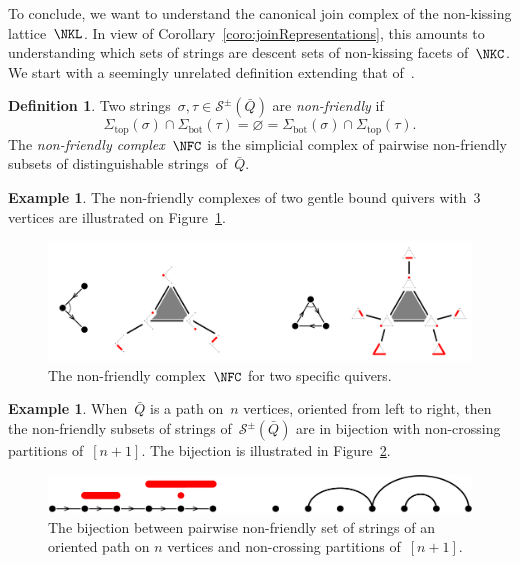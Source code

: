 \documentclass{amsart}
\theoremstyle{definition}
\newtheorem{definition}[theorem]{Definition}
\newtheorem{example}[theorem]{Example}
\newcommand{\fref}[1]{Figure~\ref{#1}} %
\newcommand{\darkblue}{\color{darkblue}} %
\newcommand{\defn}[1]{\textsl{\darkblue #1}} %
\newcommand{\strings}{\mathcal{S}} %
\renewcommand{\top}{\mathrm{top}} %
\newcommand{\bottom}{\mathrm{bot}} %
\begin{document}
\enlargethispage{.4cm}
To conclude, we want to understand the canonical join complex of the non-kissing lattice~$\NKL$.
In view of Corollary~\ref{coro:joinRepresentations}, this amounts to understanding which sets of strings are descent sets of non-kissing facets of~$\NKC$.
We start with a seemingly unrelated definition extending that of~\cite[Sect.~3.4]{GarverMcConville-grid}.

\begin{definition}\label{def: friendly}
Two strings~$\sigma, \tau \in \strings^\pm(\bar Q)$ are \defn{non-friendly} if
\[
\Sigma_\top(\sigma) \cap \Sigma_\bottom(\tau) = \varnothing = \Sigma_\bottom(\sigma) \cap \Sigma_\top(\tau).
\]
The \defn{non-friendly complex}~$\NFC$ is the simplicial complex of pairwise non-friendly subsets of distinguishable strings~of~$\bar Q$.
\end{definition}

\begin{example}
The non-friendly complexes of two gentle bound quivers with~$3$ vertices are illustrated on \fref{fig:exmNFC}.
%
\begin{figure}[t]
	\capstart
	\centerline{\includegraphics[scale=.4]{exmNFC}}
	\caption{The non-friendly complex~$\NFC$ for two specific quivers.}
	\label{fig:exmNFC}
\end{figure}
\end{example}

\begin{example}
When~$\bar Q$ is a path on~$n$ vertices, oriented from left to right, then the non-friendly subsets of strings of~$\strings^\pm(\bar Q)$ are in bijection with non-crossing partitions of~$[n+1]$.
The bijection is illustrated in \fref{fig:exmNCP}.
%
\begin{figure}[t]
	\capstart
	\centerline{\includegraphics[scale=.4]{exmNCP}}
	\caption{The bijection between pairwise non-friendly set of strings of an oriented path on $n$ vertices and non-crossing partitions of~$[n+1]$.}
	\label{fig:exmNCP}
\end{figure}
\end{example}
\end{document}
